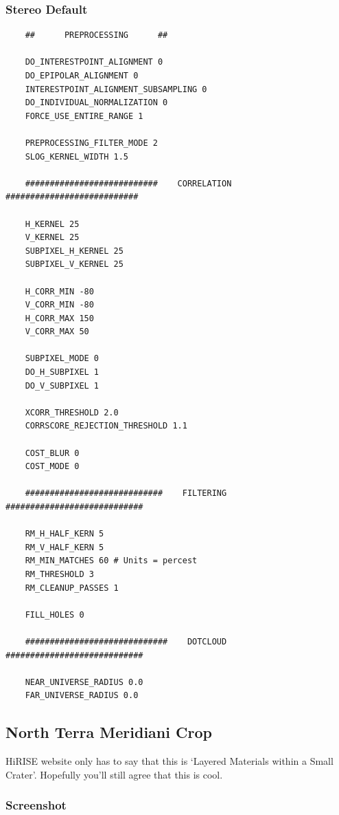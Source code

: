 \subsubsection*{Stereo Default}

\begin{verbatim}
    ##      PREPROCESSING      ##

    DO_INTERESTPOINT_ALIGNMENT 0
    DO_EPIPOLAR_ALIGNMENT 0
    INTERESTPOINT_ALIGNMENT_SUBSAMPLING 0
    DO_INDIVIDUAL_NORMALIZATION 0
    FORCE_USE_ENTIRE_RANGE 1

    PREPROCESSING_FILTER_MODE 2
    SLOG_KERNEL_WIDTH 1.5

    ###########################    CORRELATION    ###########################

    H_KERNEL 25
    V_KERNEL 25
    SUBPIXEL_H_KERNEL 25
    SUBPIXEL_V_KERNEL 25

    H_CORR_MIN -80
    V_CORR_MIN -80
    H_CORR_MAX 150
    V_CORR_MAX 50

    SUBPIXEL_MODE 0
    DO_H_SUBPIXEL 1
    DO_V_SUBPIXEL 1

    XCORR_THRESHOLD 2.0
    CORRSCORE_REJECTION_THRESHOLD 1.1

    COST_BLUR 0
    COST_MODE 0

    ############################    FILTERING    ############################

    RM_H_HALF_KERN 5
    RM_V_HALF_KERN 5
    RM_MIN_MATCHES 60 # Units = percest
    RM_THRESHOLD 3
    RM_CLEANUP_PASSES 1

    FILL_HOLES 0

    #############################    DOTCLOUD    ############################

    NEAR_UNIVERSE_RADIUS 0.0
    FAR_UNIVERSE_RADIUS 0.0
\end{verbatim}

\subsection{North Terra Meridiani Crop}

HiRISE website only has to say that this is `Layered Materials within
a Small Crater'. Hopefully you'll still agree that this is cool.

\subsubsection*{Screenshot}

